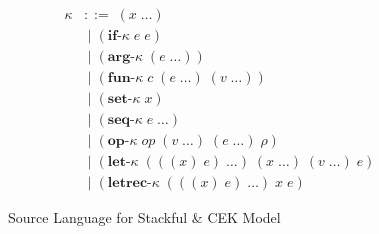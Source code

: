 \begin{figure}[!htbp]
\begin{align*}
        \kappa &::=\; (x\;\ldots)\\
               &\;|\; (\textbf{if-}\kappa\; e\; e)\\
               &\;|\; (\textbf{arg-}\kappa\; (e\;\ldots))\\
               &\;|\; (\textbf{fun-}\kappa\; c\; (e\;\ldots)\; (v\;\ldots))\\
               &\;|\; (\textbf{set-}\kappa\; x)\\
               &\;|\; (\textbf{seq-}\kappa\; e\;\ldots)\\
               &\;|\; (\textbf{op-}\kappa\; \textit{op}\; (v\;\ldots)\; (e\;\ldots)\; \rho)\\
               &\;|\; (\textbf{let-}\kappa\; (((x)\; e)\;\ldots)\; (x\;\ldots)\; (v\;\ldots)\; e)\\
               &\;|\; (\textbf{letrec-}\kappa\; (((x)\; e)\;\ldots)\; x\; e)
    \end{align*}

    \vspace{-1em}

    \caption{Source Language for Stackful \& CEK Model}
    \label{fig:st-cek-grammar}
\end{figure}